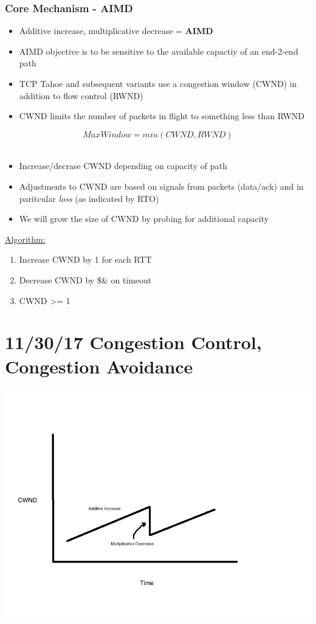 \documentclass[11pt]{article}
\begin{document}
\subsubsection{Core Mechanism - AIMD}
\label{sec:orgheadline136}
\begin{itemize}
\item Additive increase, multiplicative decrease = \textbf{AIMD}
\item AIMD objective is to be sensitive to the available capactiy of an
end-2-end path
\item TCP Tahoe and subsequent variants use a congestion window (CWND) in
addition to flow control (RWND)
\item CWND limits the number of packets in flight to something less than
RWND
\end{itemize}

\[MaxWindow = min(CWND, RWND)\] \\

\begin{itemize}
\item Increase/decrase CWND depending on capacity of path
\item Adjustments to CWND are based on signals from packets (data/ack) and
in paritcular \emph{loss} (as indicated by RTO)

\item We will grow the size of CWND by probing for additional capacity
\end{itemize}

\uline{Algorithm:}
\begin{enumerate}
\item Increase CWND by 1 for each RTT
\item Decrease CWND by \$\& on timeout
\item CWND >= 1
\end{enumerate}


\section{11/30/17 Congestion Control, Congestion Avoidance}
\label{sec:orgheadline144}

\includegraphics[width=.9\linewidth]{diagrams/AIMD.png}
\end{document}
